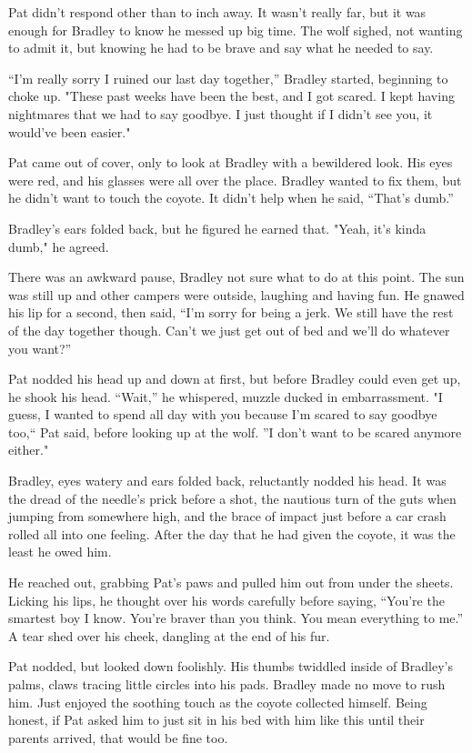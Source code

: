 Pat didn't respond other than to inch away. It wasn't really far, but it
was enough for Bradley to know he messed up big time. The wolf sighed,
not wanting to admit it, but knowing he had to be brave and say what he
needed to say.

``I'm really sorry I ruined our last day together,'' Bradley started,
beginning to choke up. "These past weeks have been the best, and I got
scared. I kept having nightmares that we had to say goodbye. I just
thought if I didn't see you, it would've been easier."

Pat came out of cover, only to look at Bradley with a bewildered look.
His eyes were red, and his glasses were all over the place. Bradley
wanted to fix them, but he didn't want to touch the coyote. It didn't
help when he said, ``That's dumb.''

Bradley's ears folded back, but he figured he earned that. "Yeah, it's
kinda dumb," he agreed.

There was an awkward pause, Bradley not sure what to do at this point.
The sun was still up and other campers were outside, laughing and having
fun. He gnawed his lip for a second, then said, ``I'm sorry for being a
jerk. We still have the rest of the day together though. Can't we just
get out of bed and we'll do whatever you want?''

Pat nodded his head up and down at first, but before Bradley could even
get up, he shook his head. ``Wait,'' he whispered, muzzle ducked in
embarrassment. "I guess, I wanted to spend all day with you because I'm
scared to say goodbye too,`` Pat said, before looking up at the wolf. ''I
don't want to be scared anymore either."

Bradley, eyes watery and ears folded back, reluctantly nodded his head.
It was the dread of the needle's prick before a shot, the nautious turn
of the guts when jumping from somewhere high, and the brace of impact
just before a car crash rolled all into one feeling. After the day that
he had given the coyote, it was the least he owed him.

He reached out, grabbing Pat's paws and pulled him out from under the
sheets. Licking his lips, he thought over his words carefully before
saying, ``You're the smartest boy I know. You're braver than you think.
You mean everything to me.'' A tear shed over his cheek, dangling at the
end of his fur.

Pat nodded, but looked down foolishly. His thumbs twiddled inside of
Bradley's palms, claws tracing little circles into his pads. Bradley
made no move to rush him. Just enjoyed the soothing touch as the coyote
collected himself. Being honest, if Pat asked him to just sit in his bed
with him like this until their parents arrived, that would be fine too.

